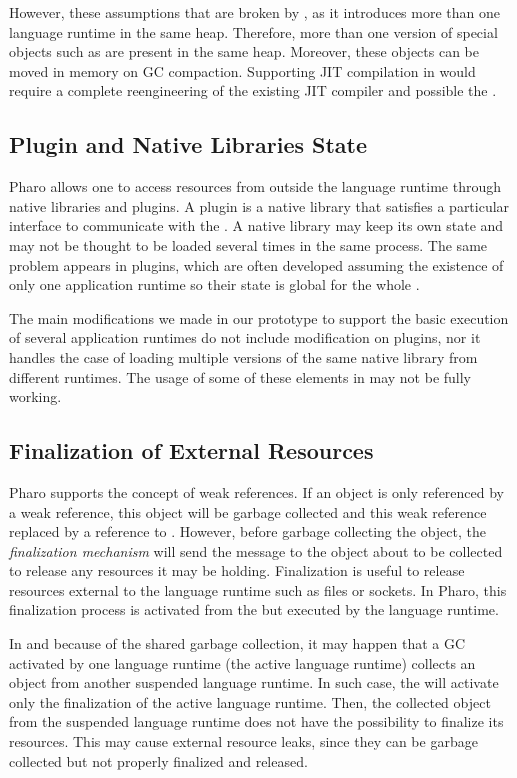 However, these assumptions that are broken by \Vtt, as it introduces more than one language runtime in the same heap. Therefore, more than one version of special objects such as  are present in the same heap. Moreover, these objects can be moved in memory on GC compaction. Supporting JIT compilation in \Vtt would require a complete reengineering of the existing JIT compiler and possible the \VM.

\subsection{Plugin and Native Libraries State}

Pharo \VM allows one to access resources from outside the language runtime through native libraries and \VM plugins. A \VM plugin is a native library that satisfies a particular interface to communicate with the \VM. A native library may keep its own state and may not be thought to be loaded several times in the same process. The same problem appears in \VM plugins, which are often developed assuming the existence of only one application runtime so their state is global for the whole \VM.

The main \VM modifications we made in our prototype to support the basic execution of several application runtimes do not include modification on \VM plugins, nor it handles the case of loading multiple versions of the same native library from different runtimes. The usage of some of these elements in \Vtt may not be fully working.

\subsection{Finalization of External Resources}

Pharo \VM supports the concept of weak references. If an object is only referenced by a weak reference, this object will be garbage collected and this weak reference replaced by a reference to . However, before garbage collecting the object, the \emph{finalization mechanism} will send the  message to the object about to be collected to release any resources it may be holding. Finalization is useful to release resources external to the language runtime such as files or sockets. In Pharo, this finalization process is activated from the \VM but executed by the language runtime.

In \Vtt and because of the shared garbage collection, it may happen that a GC activated by one language runtime (the active language runtime) collects an object from another suspended language runtime. In such case, the \VM will activate only the finalization of the active language runtime. Then, the collected object from the suspended language runtime does not have the possibility to finalize its resources. This may cause external resource leaks, since they can be garbage collected but not properly finalized and released.

